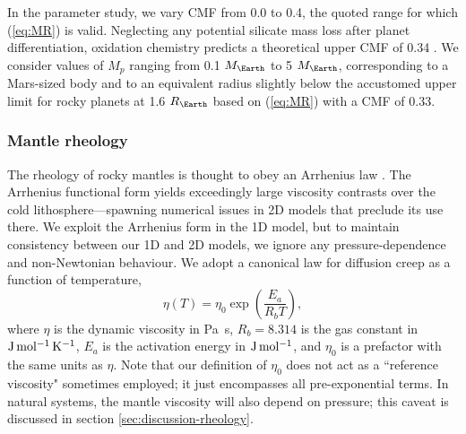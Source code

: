 \documentclass[trackchanges]{aastex63}
\begin{document}
In the parameter study, we vary CMF from 0.0 to 0.4, the quoted range for which (\ref{eq:MR}) is valid. Neglecting any potential silicate mass loss after planet differentiation, oxidation chemistry predicts a theoretical upper CMF of 0.34 \citep{dyck_effect_2021}. We consider values of $M_p$ ranging from 0.1 $M_\Earth$ to 5 $M_\Earth$, corresponding to a Mars-sized body and to an equivalent radius slightly below the accustomed upper limit for rocky planets at 1.6 $R_\Earth$ \citep{rogers_most_2015} based on (\ref{eq:MR}) with a CMF of 0.33.
 



\subsubsection{Mantle rheology}\label{sec:viscosity-model}

The rheology of rocky mantles is thought to obey an Arrhenius law \citep{karato_rheology_1993}. The Arrhenius functional form yields exceedingly large viscosity contrasts over the cold lithosphere---spawning numerical issues in 2D models that preclude its use there. We exploit the Arrhenius form in the 1D model, but to maintain consistency between our 1D and 2D models, we ignore any pressure-dependence and non-Newtonian behaviour. We adopt a canonical law for diffusion creep as a function of temperature,
\begin{equation}
    \label{eq:eta-arrhenius}
\eta(T) = \eta_0 \exp\left(\frac{E_a}{R_b T}\right),
\end{equation}
where $\eta$ is the dynamic viscosity in Pa~s, $R_b = 8.314$ is the gas constant in $\rm{J\,mol^{-1}\,K^{-1}}$, $E_a$ is the activation energy in $\rm{J\,mol^{-1}}$, and $\eta_0$ is a prefactor with the same units as $\eta$. Note that our definition of $\eta_0$ does not act as a ``reference viscosity" sometimes employed; it just encompasses all pre-exponential terms. In natural systems, the mantle viscosity will also depend on pressure; this caveat is discussed in section \ref{sec:discussion-rheology}.
\end{document}
